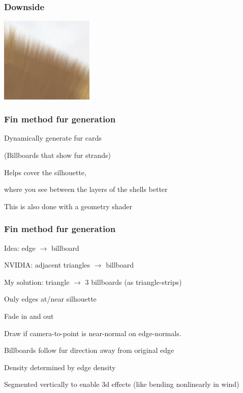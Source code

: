 \documentclass[12pt]{beamer}
\begin{document}
    \begin{frame}
        \frametitle{ Downside }

        \includegraphics[width=12em]{shellgaps}
    \end{frame}

    \begin{frame}
        \frametitle{ Fin method fur generation}
        Dynamically generate fur cards

        (Billboards that show fur strands)

        Helps cover the silhouette,

        where you see between the layers of the shells better

        This is also done with a geometry shader
    \end{frame}

    \begin{frame}
        \frametitle{ Fin method fur generation}

        Idea: edge $\rightarrow$ billboard

        NVIDIA: adjacent triangles $\rightarrow$ billboard

        My solution: triangle $\rightarrow$ 3 billboards (as triangle-strips)

        Only edges at/near silhouette

        Fade in and out

        Draw if camera-to-point is near-normal on edge-normals.

        Billboards follow fur direction away from original edge

        Density determined by edge density

        Segmented vertically to enable 3d effects (like bending nonlinearly in wind)

    \end{frame}
\end{document}
